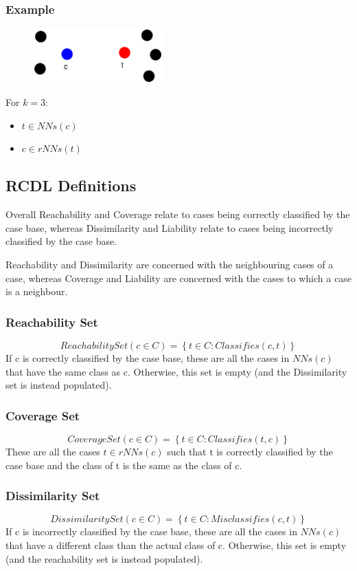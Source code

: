 \documentclass[a4paper,11pt]{report}
\begin{document}
\subsubsection{Example}
\begin{figure}[h!]
\includegraphics[width=5cm]{./Drawn/RcdlNnRnnEg}
\end{figure}

For $k=3$:
\begin{itemize}
	\item $ t \in NNs(c) $
	\item $ c \in rNNs(t) $
\end{itemize}

\subsection{RCDL Definitions}
Overall Reachability and Coverage relate to cases being correctly classified by the case base, whereas Dissimilarity and Liability relate to cases being incorrectly classified by the case base.

Reachability and Dissimilarity are concerned with the neighbouring cases of a case, whereas Coverage and Liability are concerned with the cases to which a case is a neighbour.

\subsubsection{Reachability Set}
\[ ReachabilitySet(c \in C) = \left\lbrace t \in C : Classifies(c, t) \right\rbrace \] 
If c is correctly classified by the case base, these are all the cases in $ NNs(c) $ that have the same class as c. Otherwise, this set is empty (and the Dissimilarity set is instead populated).

\subsubsection{Coverage Set}
\[ CoverageSet(c \in C) = \left\lbrace t \in C : Classifies(t, c) \right\rbrace \]
These are all the cases $ t \in rNNs(c) $ such that t is correctly classified by the case base and the class of t is the same as the class of c.

\subsubsection{Dissimilarity Set}
\[ DissimilaritySet(c \in C) = \left\lbrace t \in C : Misclassifies(c, t) \right\rbrace \]  
If c is incorrectly classified by the case base, these are all the cases in $ NNs(c) $ that have a different class than the actual class of c. Otherwise, this set is empty (and the reachability set is instead populated).
\end{document}

